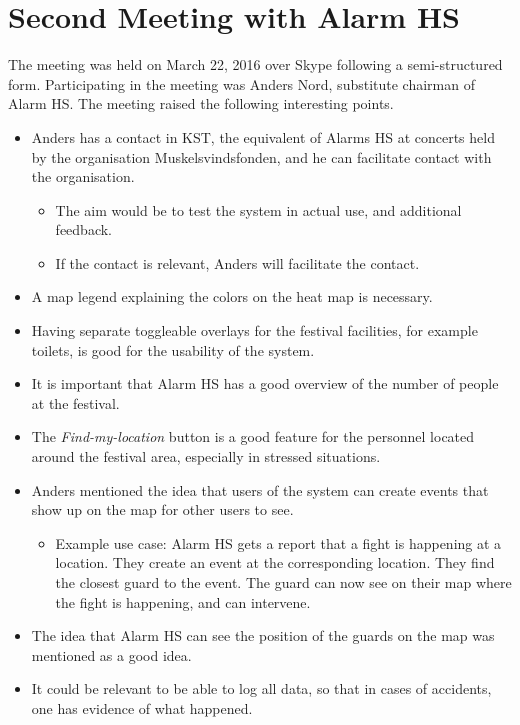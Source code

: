 \section{Second Meeting with Alarm HS}\label{sec:second_meeting_alarmhs_summary}

The meeting was held on March 22, 2016 over Skype following a semi-structured form. Participating in the meeting was Anders Nord, substitute chairman of Alarm HS. The meeting raised the following interesting points.

\begin{itemize}
    \item Anders has a contact in KST, the equivalent of Alarms HS at concerts held by the organisation Muskelsvindsfonden, and he can facilitate contact with the organisation.
    \begin{itemize}
        \item The aim would be to test the system in actual use, and additional feedback.
        \item If the contact is relevant, Anders will facilitate the contact.
    \end{itemize}
    \item A map legend explaining the colors on the heat map is necessary.
    \item Having separate toggleable overlays for the festival facilities, for example toilets, is good for the usability of the system.
    \item It is important that Alarm HS has a good overview of the number of people at the festival.
    \item The \emph{Find-my-location} button is a good feature for the personnel located around the festival area, especially in stressed situations.
    \item Anders mentioned the idea that users of the system can create events that show up on the map for other users to see.
    \begin{itemize}
        \item Example use case: Alarm HS gets a report that a fight is happening at a location. They create an event at the corresponding location. They find the closest guard to the event. The guard can now see on their map where the fight is happening, and can intervene.
    \end{itemize}
    \item The idea that Alarm HS can see the position of the guards on the map was mentioned as a good idea.
    \item It could be relevant to be able to log all data, so that in cases of accidents, one has evidence of what happened.

\end{itemize}
